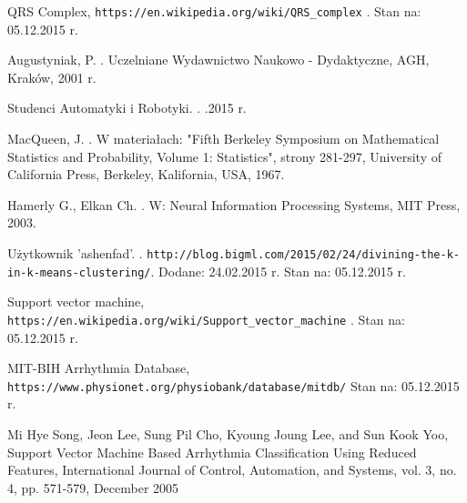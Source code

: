 
\begin{thebibliography}{99} %

 
QRS Complex,
\newblock \texttt{https://en.wikipedia.org/wiki/QRS\_complex} .
\newblock Stan na: 05.12.2015 r.

Augustyniak, P.
.
\newblock Uczelniane Wydawnictwo Naukowo - Dydaktyczne, AGH, Kraków, 2001 r.


Studenci Automatyki i Robotyki.
.
.2015 r.

MacQueen, J.
.
\newblock W materiałach: "Fifth Berkeley Symposium on Mathematical Statistics and Probability, Volume 1: Statistics", strony 281-297,
\newblock University of California Press, Berkeley, Kalifornia, USA, 1967. 

Hamerly G., Elkan Ch.
.
\newblock W: Neural Information Processing Systems,
\newblock MIT Press, 2003.

Użytkownik 'ashenfad'.
.
\newblock \texttt{http://blog.bigml.com/2015/02/24/divining-the-k-in-k-means-clustering/}. 
\newblock Dodane: 24.02.2015 r.
\newblock Stan na: 05.12.2015 r.

Support vector machine,
\newblock \texttt{https://en.wikipedia.org/wiki/Support\_vector\_machine} .
\newblock Stan na: 05.12.2015 r.

MIT-BIH Arrhythmia Database,
\newblock \texttt{https://www.physionet.org/physiobank/database/mitdb/}
\newblock Stan na: 05.12.2015 r.

Mi Hye Song, Jeon Lee, Sung Pil Cho, Kyoung Joung Lee, and Sun Kook Yoo,
\newblock Support Vector Machine Based Arrhythmia Classification Using Reduced Features,
\newblock 
International Journal of Control, Automation, and Systems, vol. 3, no. 4, pp. 571-579, December 2005 


\end{thebibliography}
